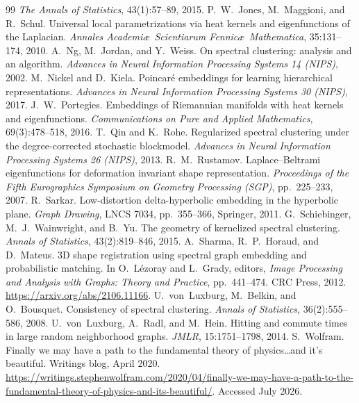 \documentclass[review]{siamart220329}
\begin{document}
\begin{thebibliography}{99}
\emph{The Annals of Statistics}, 43(1):57--89, 2015.
 P.~W.~Jones, M.~Maggioni, and R.~Schul. Universal local
parametrizations via heat kernels and eigenfunctions of the Laplacian.
\emph{Annales Academi\ae\ Scientiarum Fennic\ae\ Mathematica}, 35:131--174, 2010.
 A.~Ng, M.~Jordan, and Y.~Weiss. On spectral clustering:
analysis and an algorithm. \emph{Advances in Neural Information
Processing Systems 14 (NIPS)}, 2002.
 M.~Nickel and D.~Kiela. Poincar\'e embeddings for learning
hierarchical representations. \emph{Advances in Neural Information
Processing Systems 30 (NIPS)}, 2017.
 J.~W.~Portegies. Embeddings of Riemannian manifolds
with heat kernels and eigenfunctions. \emph{Communications on Pure and Applied
Mathematics}, 69(3):478--518, 2016.
 T.~Qin and K.~Rohe. Regularized spectral clustering
under the degree-corrected stochastic blockmodel. \emph{Advances in Neural
Information Processing Systems 26 (NIPS)}, 2013.
 R.~M.~Rustamov. Laplace--Beltrami eigenfunctions for
deformation invariant shape representation. \emph{Proceedings of the Fifth
Eurographics Symposium on Geometry Processing (SGP)}, pp.~225--233, 2007.
 R.~Sarkar. Low-distortion delta-hyperbolic embedding in the
hyperbolic plane. \emph{Graph Drawing}, LNCS 7034, pp.~355--366, Springer,
2011.
 G.~Schiebinger, M.~J.~Wainwright, and B.~Yu. The
geometry of kernelized spectral clustering. \emph{Annals of Statistics},
43(2):819--846, 2015.
 A.~Sharma, R.~P.~Horaud, and D.~Mateus. 3D shape
registration using spectral graph embedding and probabilistic matching. In
O.~L\'ezoray and L.~Grady, editors, \emph{Image Processing and Analysis with
Graphs: Theory and Practice}, pp.~441--474. CRC Press, 2012.
\url{https://arxiv.org/abs/2106.11166}.
 U.~von~Luxburg, M.~Belkin, and O.~Bousquet.
Consistency of spectral clustering. \emph{Annals of Statistics},
36(2):555--586, 2008.
 U.~von~Luxburg, A.~Radl, and M.~Hein. Hitting and
commute times in large random neighborhood graphs. \emph{JMLR},
15:1751--1798, 2014.
 S.~Wolfram. Finally we may have a path to the fundamental
theory of physics\ldots and it's beautiful. Writings blog, April 2020.
\url{https://writings.stephenwolfram.com/2020/04/finally-we-may-have-a-path-to-the-fundamental-theory-of-physics-and-its-beautiful/}. Accessed July 2026.
\end{thebibliography}
\end{document}
